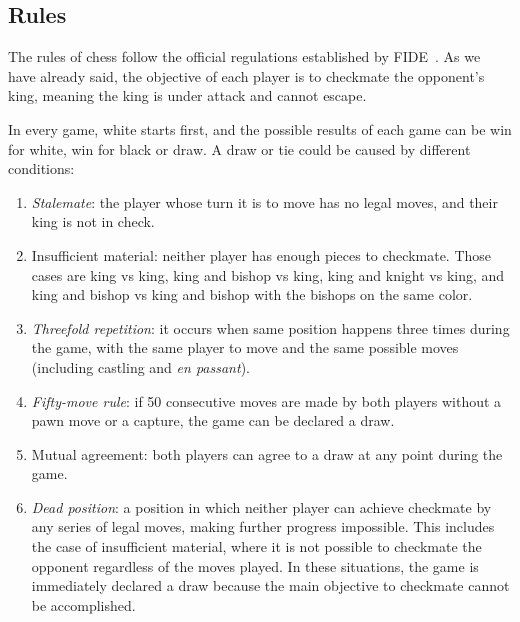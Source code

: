 \subsection{Rules}\label{sec:rules}

The rules of chess follow the official regulations established by FIDE~\cite{LawsOfChess}. As we have already said, the objective of each player is to checkmate the opponent's king, meaning the king is under attack and cannot escape.

\vspace{1em}

\noindent In every game, white starts first, and the possible results of each game can be win for white, win for black or draw. A draw or tie could be caused by different conditions:

\begin{enumerate}
    \item \textit{Stalemate}: the player whose turn it is to move has no legal moves, and their king is not in check.
    \item Insufficient material: neither player has enough pieces to checkmate. Those cases are king vs king, king and bishop vs king, king and knight vs king, and king and bishop vs king and bishop with the bishops on the same color.
    \item \textit{Threefold repetition}: it occurs when same position happens three times during the game, with the same player to move and the same possible moves (including castling and \textit{en passant}).
    \item \textit{Fifty-move rule}: if 50 consecutive moves are made by both players without a pawn move or a capture, the game can be declared a draw.
    \item Mutual agreement: both players can agree to a draw at any point during the game.
    \item \textit{Dead position}: a position in which neither player can achieve checkmate by any series of legal moves, making further progress impossible. This includes the case of insufficient material, where it is not possible to checkmate the opponent regardless of the moves played. In these situations, the game is immediately declared a draw because the main objective to checkmate cannot be accomplished.
\end{enumerate}

